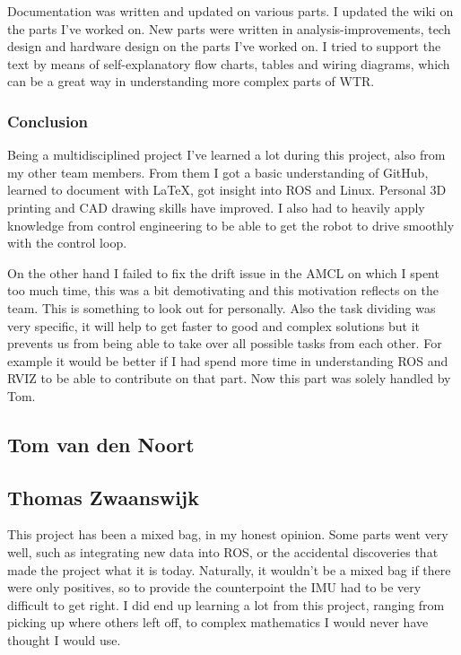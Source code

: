 Documentation was written and updated on various parts. 
I updated the wiki on the parts I've worked on. 
New parts were written in analysis-improvements, tech design and hardware design on the parts I've worked on. 
I tried to support the text by means of self-explanatory flow charts, tables and wiring diagrams, which can be a great way in understanding more complex parts of WTR. 

\subsubsection{Conclusion}
Being a multidisciplined project I've learned a lot during this project, also from my other team members.
From them I got a basic understanding of GitHub, learned to document with \LaTeX, got insight into ROS and Linux. 
Personal 3D printing and CAD drawing skills have improved. 
I also had to heavily apply knowledge from control engineering to be able to get the robot to drive smoothly with the control loop.

On the other hand I failed to fix the drift issue in the AMCL on which I spent too much time, this was a bit demotivating and this motivation reflects on the team. This is something to look out for personally. 
Also the task dividing was very specific, it will help to get faster to good and complex solutions but it prevents us from being able to take over all possible tasks from each other. 
For example it would be better if I had spend more time in understanding ROS and RVIZ to be able to contribute on that part. 
Now this part was solely handled by Tom.

\newpage

\subsection{Tom van den Noort}

\newpage

\subsection{Thomas Zwaanswijk}
This project has been a mixed bag, in my honest opinion.
Some parts went very well, such as integrating new data into ROS, or the accidental discoveries that made the project what it is today.
Naturally, it wouldn't be a mixed bag if there were only positives, so to provide the counterpoint the IMU had to be very difficult to get right.
I did end up learning a lot from this project, ranging from picking up where others left off, to complex mathematics I would never have thought I would use.

